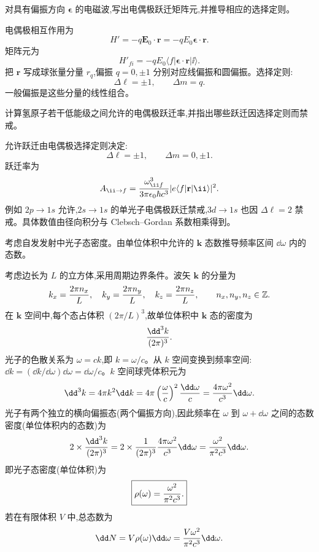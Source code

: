 \begin{question}
对具有偏振方向 $\boldsymbol\epsilon$ 的电磁波,写出电偶极跃迁矩阵元,并推导相应的选择定则。
\end{question}
\begin{solution}
电偶极相互作用为
\[
H'=-q\mathbf E_0\cdot\mathbf r=-qE_0\boldsymbol\epsilon\cdot\mathbf r.
\]
矩阵元为
\[
H'_{fi}=-qE_0\langle f|\boldsymbol\epsilon\cdot\mathbf r|\ii\rangle.
\]
把 $\mathbf r$ 写成球张量分量 $r_q$,偏振 $q=0,\pm1$ 分别对应线偏振和圆偏振。选择定则:
\[
\Delta\ell=\pm1,
\qquad
\Delta m=q.
\]
一般偏振是这些分量的线性组合。
\end{solution}

\begin{question}
计算氢原子若干低能级之间允许的电偶极跃迁率,并指出哪些跃迁因选择定则而禁戒。
\end{question}
\begin{solution}
允许跃迁由电偶极选择定则决定:
\[
\Delta\ell=\pm1,
\qquad \Delta m=0,\pm1.
\]
跃迁率为
\[
A_{\ii\to f}={\omega_{\ii f}^3\over3\pi\epsilon_0\hbar c^3}|e\langle f|\mathbf r|\ii\rangle|^2.
\]
例如 $2p\to1s$ 允许,$2s\to1s$ 的单光子电偶极跃迁禁戒,$3d\to1s$ 也因 $\Delta\ell=2$ 禁戒。具体数值由径向积分与 Clebsch--Gordan 系数相乘得到。
\end{solution}

\begin{question}
考虑自发发射中光子态密度。由单位体积中允许的 $\mathbf k$ 态数推导频率区间 $\dd\omega$ 内的态数。
\end{question}
\begin{solution}
考虑边长为 $L$ 的立方体,采用周期边界条件。波矢 $\mathbf k$ 的分量为
\[
k_x={2\pi n_x\over L},\quad k_y={2\pi n_y\over L},\quad k_z={2\pi n_z\over L},\qquad n_x,n_y,n_z\in\mathbb Z.
\]
在 $\mathbf k$ 空间中,每个态占体积 $(2\pi/L)^3$,故单位体积中 $\mathbf k$ 态的密度为
\[
{\dd^3k\over(2\pi)^3}.
\]
光子的色散关系为 $\omega=ck$,即 $k=\omega/c$。从 $k$ 空间变换到频率空间:$\dd k=(\dd k/\dd\omega)\dd\omega=\dd\omega/c$。$k$ 空间球壳体积元为
\[
\dd^3k=4\pi k^2\dd k=4\pi\left({\omega\over c}\right)^2{\dd\omega\over c}
={4\pi\omega^2\over c^3}\dd\omega.
\]
光子有两个独立的横向偏振态(两个偏振方向),因此频率在 $\omega$ 到 $\omega+\dd\omega$ 之间的态数密度(单位体积内的态数)为
\[
2\times{\dd^3k\over(2\pi)^3}
=2\times{1\over(2\pi)^3}{4\pi\omega^2\over c^3}\dd\omega
={\omega^2\over\pi^2c^3}\dd\omega.
\]
即光子态密度(单位体积)为
\[
\boxed{\rho(\omega)={\omega^2\over\pi^2c^3}.}
\]
若在有限体积 $V$ 中,总态数为
\[
\dd N=V\rho(\omega)\dd\omega={V\omega^2\over\pi^2c^3}\dd\omega.
\]
\end{solution}

